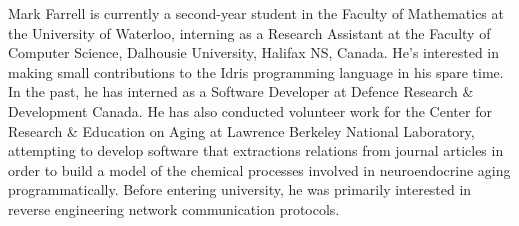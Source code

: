 Mark Farrell is currently a second-year student in the Faculty of Mathematics at the University of Waterloo, interning as a Research Assistant at the Faculty of Computer Science, Dalhousie University, Halifax NS, Canada.
He's interested in making small contributions to the Idris programming language in his spare time. In the past, he has interned as a Software Developer at Defence Research \& Development Canada. He has also conducted volunteer
work for the Center for Research \& Education on Aging at Lawrence Berkeley National Laboratory, attempting to develop software that extractions relations from journal articles in order to build a model of the chemical processes
involved in neuroendocrine aging programmatically. Before entering university, he was primarily interested in reverse engineering network communication protocols.
